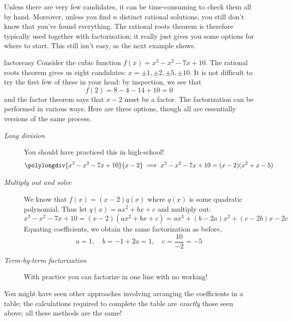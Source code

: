Unless there are very few candidates, it can be time-consuming to check them all by hand. Moreover, unless you find $n$ distinct rational solutions, you still don't know that you've found everything. The rational roots theorem is therefore typically used together with factorization; it really just gives you some options for where to start. This still isn't easy, as the next example shows.
\goodbreak

\begin{example}{}{factoreasy}
	Consider the cubic function $f(x)=x^3-x^2-7x+10$. The rational roots theorem gives us eight candidates: $x=\pm 1,\pm 2,\pm 5,\pm 10$. It is not difficult to try the first few of these in your head: by inspection, we see that
	\[
		f(2)=8-4-14+10=0
	\]
	and the factor theorem says that $x-2$ must be a factor. The factorization can be performed in various ways. Here are three options, though all are essentially versions of the same process.
	\begin{description}
	\item[\normalfont\emph{Long division}]\lstsp You should have practiced this in high-school!
  \[
  	\polylongdiv{x^3-x^2-7x+10}{x-2} \implies x^3-x^2-7x+10=(x-2)(x^2+x-5)
  \]
  \item[\normalfont\emph{Multiply out and solve}]\lstsp We know that $f(x)=(x-2)q(x)$ where $q(x)$ is some quadratic polynomial. Thus let $q(x)=ax^2+bx+c$ and multiply out:
  \[
  	x^3-x^2-7x+10=(x-2)(ax^2+bx+c) =ax^3+(b-2a)x^2+(c-2b)x-2c
  \]
  Equating coefficients, we obtain the same factorization as before,
  \[
  	a=1,\quad b=-1+2a=1,\quad c=\frac{10}{-2}=-5
  \]
  \item[\normalfont\emph{Term-by-term factorization}]\lstsp With practice you can factorize in one line with no working!
\end{description}
	
	You might have seen other approaches involving arranging the coefficients in a table; the calculations required to complete the table are \emph{exactly} those seen above; all these methods are the same!
\end{example}

